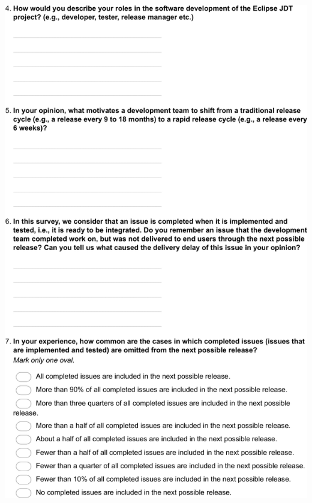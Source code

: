 \documentclass[
	12pt,				%
	openright,			%
	oneside,			%
	a4paper,			%
	french,				%
	spanish,			%
	brazil,				%
	english
	]{abntex2}
\newcounter{pt}
\newcounter{th}
\begin{document}
\begin{apendicesenv}
\includegraphics[width=.8\textwidth,keepaspectratio]{chapters/chapter5/appendix/Eclipse2.pdf}


\end{apendicesenv}
\end{document}

